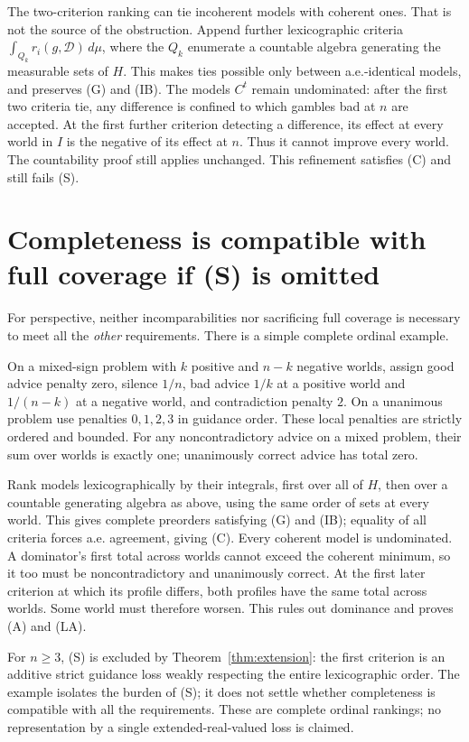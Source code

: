 \documentclass[11pt]{article}
\theoremstyle{remark}\newtheorem{remark}[theorem]{Remark}
\newcommand{\Dscr}{\mathcal D}
\begin{document}
The two-criterion ranking can tie incoherent models with coherent ones.
That is not the source of the obstruction. Append further lexicographic
criteria $\int_{Q_k}r_i(g,\Dscr)\,d\mu$, where the $Q_k$ enumerate a
countable algebra generating the measurable sets of $H$. This makes ties
possible only between a.e.-identical models, and preserves (G) and (IB).
The models $C^t$ remain undominated: after the first two criteria tie,
any difference is confined to which gambles bad at $n$ are accepted.
At the first further criterion detecting a difference, its effect at every
world in $I$ is the negative of its effect at $n$. Thus it cannot improve
every world. The countability proof still applies unchanged. This refinement
satisfies (C) and still fails (S).

\section{Completeness is compatible with full coverage if (S) is omitted}

For perspective, neither incomparabilities nor sacrificing full coverage
is necessary to meet all the \emph{other} requirements. There is a simple
complete ordinal example.

On a mixed-sign problem with $k$ positive and $n-k$ negative worlds, assign
good advice penalty zero, silence $1/n$, bad advice $1/k$ at a positive
world and $1/(n-k)$ at a negative world, and contradiction penalty $2$.
On a unanimous problem use penalties $0,1,2,3$ in guidance order.
These local penalties are strictly ordered and bounded.
For any noncontradictory advice on a mixed problem, their sum over worlds
is exactly one; unanimously correct advice has total zero.

Rank models lexicographically by their integrals, first over all of $H$,
then over a countable generating algebra as above, using the same order
of sets at every world. This gives complete preorders satisfying (G) and
(IB); equality of all criteria forces a.e. agreement, giving (C).
Every coherent model is undominated. A dominator's first total across
worlds cannot exceed the coherent minimum, so it too must be noncontradictory
and unanimously correct. At the first later criterion at which its profile
differs, both profiles have the same total across worlds. Some world must
therefore worsen. This rules out dominance and proves (A) and (LA).

For $n\ge3$, (S) is excluded by Theorem~\ref{thm:extension}: the first
criterion is an additive strict guidance loss weakly respecting the entire
lexicographic order. The example isolates the burden of (S); it does not
settle whether completeness is compatible with all the requirements.
These are complete ordinal rankings; no representation by a single
extended-real-valued loss is claimed.
\end{document}
